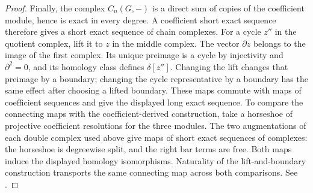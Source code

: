 \begin{proof}
Finally, the complex \(C_n(G,-)\) is a direct sum of copies of
the coefficient module, hence is exact in every degree.
A coefficient short exact sequence therefore gives a short
exact sequence of chain complexes. For a cycle \(z''\) in the
quotient complex, lift it to \(z\) in the middle complex.
The vector \(\partial z\) belongs to the image of the first
complex. Its unique preimage is a cycle by injectivity and
\(\partial^2=0\), and its homology class defines
\(\delta[z'']\). Changing the lift changes that preimage by a
boundary; changing the cycle representative by a boundary has
the same effect after choosing a lifted boundary. These maps
commute with maps of coefficient sequences and give the
displayed long exact sequence. To compare the connecting maps
with the coefficient-derived construction, take a horseshoe of
projective coefficient resolutions for the three modules.
The two augmentations of each double complex used above give
maps of short exact sequences of complexes: the horseshoe is
degreewise split, and the right bar terms are free. Both maps
induce the displayed homology isomorphisms. Naturality of the
lift-and-boundary construction transports the same connecting
map across both comparisons.
See \cite[Section 6.1 and Application 6.5.4]{weibel}.
\end{proof}

